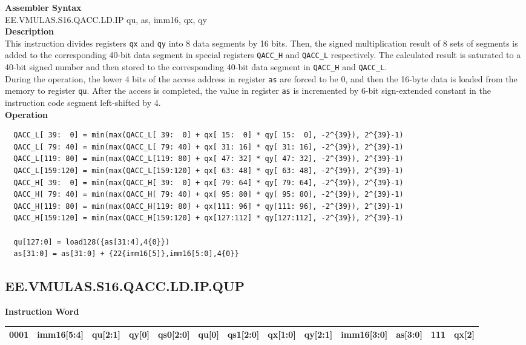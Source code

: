 \textbf{Assembler Syntax} \\
EE.VMULAS.S16.QACC.LD.IP qu, as, imm16, qx, qy \\
\textbf{Description} \\
This instruction divides registers \lstinline{qx} and \lstinline{qy} into 8 data segments by 16 bits. Then, the signed multiplication result of 8 sets of segments is added to the corresponding 40-bit data segment in special registers \lstinline{QACC_H} and \lstinline{QACC_L} respectively. The calculated result is saturated to a 40-bit signed number and then stored to the corresponding 40-bit data segment in \lstinline{QACC_H} and \lstinline{QACC_L}.\\
During the operation, the lower 4 bits of the access address in register \lstinline{as} are forced to be 0, and then the 16-byte data is loaded from the memory to register \lstinline{qu}. After the access is completed, the value in register \lstinline{as} is incremented by 6-bit sign-extended constant in the instruction code segment left-shifted by 4.\\
\textbf{Operation}
\begin{lstlisting}
  QACC_L[ 39:  0] = min(max(QACC_L[ 39:  0] + qx[ 15:  0] * qy[ 15:  0], -2^{39}), 2^{39}-1)
  QACC_L[ 79: 40] = min(max(QACC_L[ 79: 40] + qx[ 31: 16] * qy[ 31: 16], -2^{39}), 2^{39}-1)
  QACC_L[119: 80] = min(max(QACC_L[119: 80] + qx[ 47: 32] * qy[ 47: 32], -2^{39}), 2^{39}-1)
  QACC_L[159:120] = min(max(QACC_L[159:120] + qx[ 63: 48] * qy[ 63: 48], -2^{39}), 2^{39}-1)
  QACC_H[ 39:  0] = min(max(QACC_H[ 39:  0] + qx[ 79: 64] * qy[ 79: 64], -2^{39}), 2^{39}-1)
  QACC_H[ 79: 40] = min(max(QACC_H[ 79: 40] + qx[ 95: 80] * qy[ 95: 80], -2^{39}), 2^{39}-1)
  QACC_H[119: 80] = min(max(QACC_H[119: 80] + qx[111: 96] * qy[111: 96], -2^{39}), 2^{39}-1)
  QACC_H[159:120] = min(max(QACC_H[159:120] + qx[127:112] * qy[127:112], -2^{39}), 2^{39}-1)

  qu[127:0] = load128({as[31:4],4{0}})
  as[31:0] = as[31:0] + {22{imm16[5]},imm16[5:0],4{0}}
\end{lstlisting}

\clearpage
\subsection{EE.VMULAS.S16.QACC.LD.IP.QUP}\label{instruction:EEVMULASS16QACCLDIPQUP}
\setlength\tabcolsep{5pt}
\textbf{Instruction Word} \\
\begin{tabular}{|c|c|c|c|c|c|c|c|c|c|c|c|c|}
	\hline
	0001 & imm16[5:4] & qu[2:1] & qy[0] & qs0[2:0] & qu[0] & qs1[2:0] & qx[1:0] & qy[2:1] & imm16[3:0] & as[3:0] & 111 & qx[2] \\
	\hline
\end{tabular}


